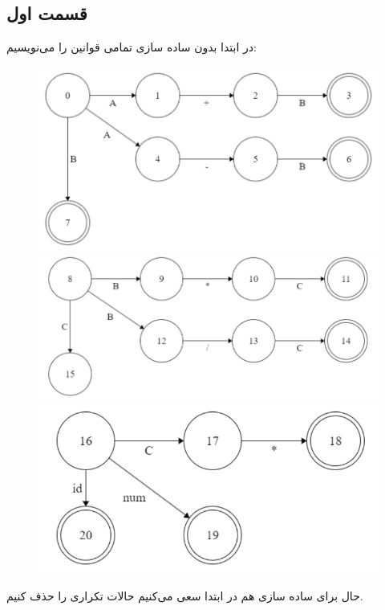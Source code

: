 \documentclass[]{article}
\begin{document}
\subsection*{قسمت اول}
در ابتدا بدون ساده سازی تمامی قوانین را می‌نویسیم:
\begin{figure}[H]
    \centering
    \includegraphics[scale=0.5]{figure/5-1-A.png}
    \includegraphics[scale=0.5]{figure/5-1-B.png}
    \includegraphics[scale=0.5]{figure/5-1-C.png}
\end{figure}
حال برای ساده سازی هم در ابتدا سعی می‌کنیم حالات تکراری را حذف کنیم.
\end{document}

